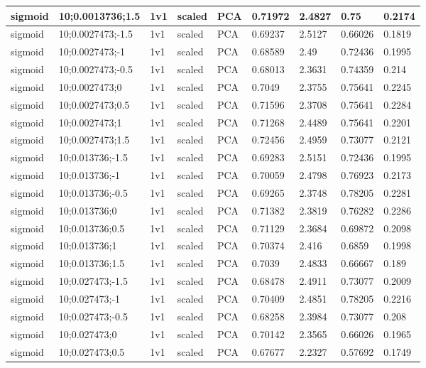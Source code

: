\begin{longtable}{lllllllll}
sigmoid & 10;0.0013736;1.5 & 1v1 & scaled & PCA & 0.71972 & 2.4827 & 0.75 & 0.2174\\ \hline
sigmoid & 10;0.0027473;-1.5 & 1v1 & scaled & PCA & 0.69237 & 2.5127 & 0.66026 & 0.1819\\ \hline
sigmoid & 10;0.0027473;-1 & 1v1 & scaled & PCA & 0.68589 & 2.49 & 0.72436 & 0.1995\\ \hline
sigmoid & 10;0.0027473;-0.5 & 1v1 & scaled & PCA & 0.68013 & 2.3631 & 0.74359 & 0.214\\ \hline
sigmoid & 10;0.0027473;0 & 1v1 & scaled & PCA & 0.7049 & 2.3755 & 0.75641 & 0.2245\\ \hline
sigmoid & 10;0.0027473;0.5 & 1v1 & scaled & PCA & 0.71596 & 2.3708 & 0.75641 & 0.2284\\ \hline
sigmoid & 10;0.0027473;1 & 1v1 & scaled & PCA & 0.71268 & 2.4489 & 0.75641 & 0.2201\\ \hline
sigmoid & 10;0.0027473;1.5 & 1v1 & scaled & PCA & 0.72456 & 2.4959 & 0.73077 & 0.2121\\ \hline
sigmoid & 10;0.013736;-1.5 & 1v1 & scaled & PCA & 0.69283 & 2.5151 & 0.72436 & 0.1995\\ \hline
sigmoid & 10;0.013736;-1 & 1v1 & scaled & PCA & 0.70059 & 2.4798 & 0.76923 & 0.2173\\ \hline
sigmoid & 10;0.013736;-0.5 & 1v1 & scaled & PCA & 0.69265 & 2.3748 & 0.78205 & 0.2281\\ \hline
sigmoid & 10;0.013736;0 & 1v1 & scaled & PCA & 0.71382 & 2.3819 & 0.76282 & 0.2286\\ \hline
sigmoid & 10;0.013736;0.5 & 1v1 & scaled & PCA & 0.71129 & 2.3684 & 0.69872 & 0.2098\\ \hline
sigmoid & 10;0.013736;1 & 1v1 & scaled & PCA & 0.70374 & 2.416 & 0.6859 & 0.1998\\ \hline
sigmoid & 10;0.013736;1.5 & 1v1 & scaled & PCA & 0.7039 & 2.4833 & 0.66667 & 0.189\\ \hline
sigmoid & 10;0.027473;-1.5 & 1v1 & scaled & PCA & 0.68478 & 2.4911 & 0.73077 & 0.2009\\ \hline
sigmoid & 10;0.027473;-1 & 1v1 & scaled & PCA & 0.70409 & 2.4851 & 0.78205 & 0.2216\\ \hline
sigmoid & 10;0.027473;-0.5 & 1v1 & scaled & PCA & 0.68258 & 2.3984 & 0.73077 & 0.208\\ \hline
sigmoid & 10;0.027473;0 & 1v1 & scaled & PCA & 0.70142 & 2.3565 & 0.66026 & 0.1965\\ \hline
sigmoid & 10;0.027473;0.5 & 1v1 & scaled & PCA & 0.67677 & 2.2327 & 0.57692 & 0.1749\\ \hline

\end{longtable}
